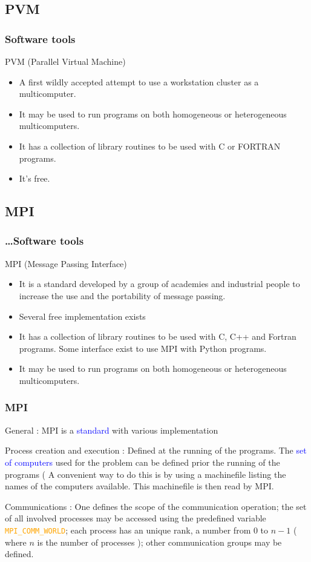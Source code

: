 \documentclass{beamer}
\begin{document}
\subsection{PVM}
\begin{frame}
\frametitle{Software tools}
\alert{PVM (Parallel Virtual Machine)}
\begin{itemize}
\item A first wildly accepted attempt to use a workstation cluster as a multicomputer.
\item It may be used to run programs on both homogeneous or heterogeneous multicomputers.
\item It has a collection of library routines to be used with C or FORTRAN programs.
\item It's free.
\end{itemize}
\end{frame}

\subsection{MPI}
\begin{frame}
\frametitle{\ldots Software tools}

\alert{MPI (Message Passing Interface)}
\begin{itemize}
\item It is a standard developed by a group of academies and industrial people
  to increase the use and the portability of message passing.
\item Several free implementation exists
\item It has a collection of library routines to be used with C, C++ and Fortran
programs. Some interface exist to use MPI with Python programs.
\item It may be used to run programs on both homogeneous or heterogeneous multicomputers.
\end{itemize}
\end{frame}

\begin{frame}
\frametitle{MPI}

\textcolor{orange!75}{General} : MPI is a \textcolor{blue}{standard} with various
implementation

\textcolor{orange!75}{Process creation and execution} : Defined at the running
of the programs. The \textcolor{blue}{set of computers} used for the
problem can be defined prior the running of the programs ( A convenient
way to do this is by using a \alert{machinefile} listing the names
of the computers available. This machinefile is then read by MPI.

\textcolor{orange!75}{Communications} : One defines the \alert{scope} of the
communication operation; the set of all involved processes may be
accessed using the predefined variable \texttt{\textcolor{orange}
{MPI\_COMM\_WORLD}}; each process has an unique rank, a number
from 0 to $n-1$ ( where $n$ is the number of processes ); other
communication groups may be defined.

\end{frame}
\end{document}
